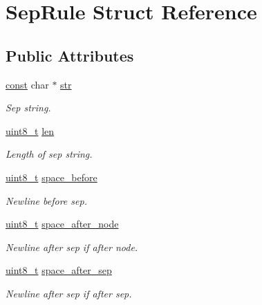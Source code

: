 \hypertarget{struct_sep_rule}{}\section{Sep\+Rule Struct Reference}
\label{struct_sep_rule}
\subsection*{Public Attributes}
\begin{DoxyCompactItemize}
\item 
\hyperlink{getopt1_8c_a2c212835823e3c54a8ab6d95c652660e}{const} char $\ast$ \hyperlink{struct_sep_rule_afb217cbb5878124afd5ef4eebeec8ee1}{str}
\begin{DoxyCompactList}\small\item\em Sep string. \end{DoxyCompactList}\item 
\hyperlink{lib-src_2ffmpeg_2win32_2stdint_8h_a9a941819355e6f658991890ff66b4b0e}{uint8\+\_\+t} \hyperlink{struct_sep_rule_aa58a34eb7afeaca8a25e94a9f0124e79}{len}
\begin{DoxyCompactList}\small\item\em Length of sep string. \end{DoxyCompactList}\item 
\hyperlink{lib-src_2ffmpeg_2win32_2stdint_8h_a9a941819355e6f658991890ff66b4b0e}{uint8\+\_\+t} \hyperlink{struct_sep_rule_a153097be741a3553b7680af1ee9c3f1c}{space\+\_\+before}
\begin{DoxyCompactList}\small\item\em Newline before sep. \end{DoxyCompactList}\item 
\hyperlink{lib-src_2ffmpeg_2win32_2stdint_8h_a9a941819355e6f658991890ff66b4b0e}{uint8\+\_\+t} \hyperlink{struct_sep_rule_a370e32e8e0ce10c53bb35213206160d7}{space\+\_\+after\+\_\+node}
\begin{DoxyCompactList}\small\item\em Newline after sep if after node. \end{DoxyCompactList}\item 
\hyperlink{lib-src_2ffmpeg_2win32_2stdint_8h_a9a941819355e6f658991890ff66b4b0e}{uint8\+\_\+t} \hyperlink{struct_sep_rule_a01139ef275673bd6a9ee8eb17dc670cc}{space\+\_\+after\+\_\+sep}
\begin{DoxyCompactList}\small\item\em Newline after sep if after sep. \end{DoxyCompactList}\end{DoxyCompactItemize}


